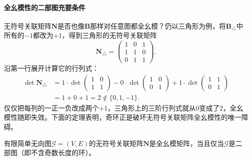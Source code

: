 \paragraph{全幺模性的二部图充要条件}

无符号关联矩阵$\bm{N}$是否也像$\bm{B}$那样对任意图都全幺模？仍以三角形为例，将$\bm{B}_\triangle$中所有的$-1$都改为$+1$，得到三角形的无符号关联矩阵
\[
\bm{N}_\triangle=
\begin{pmatrix}
1&0&1\\
1&1&0\\
0&1&1
\end{pmatrix}.
\]
沿第一行展开计算它的行列式：
\[
\begin{aligned}
\det\bm{N}_\triangle
&=1\cdot\det\begin{pmatrix}1&0\\1&1\end{pmatrix}
-0\cdot\det\begin{pmatrix}1&0\\0&1\end{pmatrix}
+1\cdot\det\begin{pmatrix}1&1\\0&1\end{pmatrix}\\
&=1+0+1=2\notin\{0,1,-1\}.
\end{aligned}
\]
仅仅把每列的一正一负改成两个$+1$，三角形上的三阶行列式就从$0$变成了$2$，全幺模性随即失效。下面的定理表明，奇环正是破坏无符号关联矩阵全幺模性的唯一障碍。

\begin{theorem}[无符号关联矩阵的全幺模性判别]
\label{thm:graph-unsigned-incidence-tu}
有限简单无向图$\mathcal{G}=(V,E)$的无符号关联矩阵$\bm{N}$是全幺模矩阵，当且仅当$\mathcal{G}$是二部图（即不含奇数长度的环）。
\end{theorem}

